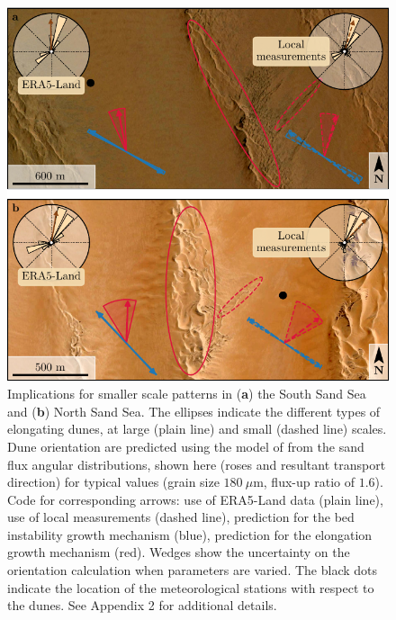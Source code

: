 \begin{figure}
\centering
\includegraphics[scale=1]{Figures/Figure9.pdf}
\caption{Implications for smaller scale patterns in (\textbf{a}) the South Sand Sea and (\textbf{b}) North Sand Sea. The ellipses indicate the different types of elongating dunes, at large (plain line) and small (dashed line) scales. Dune orientation are predicted using the model of \citet{Courrech2014} from the sand flux angular distributions, shown here (roses and resultant transport direction) for typical values (grain size $180~\mu$m, flux-up ratio of $1.6$). Code for corresponding arrows: use of ERA5-Land data (plain line), use of local measurements (dashed line), prediction for the bed instability growth mechanism (blue), prediction for the elongation growth mechanism (red). Wedges show the uncertainty on the orientation calculation when parameters are varied. The black dots indicate the location of the meteorological stations with respect to the dunes. See Appendix 2 for additional details.}
\label{Fig9}
\end{figure}


